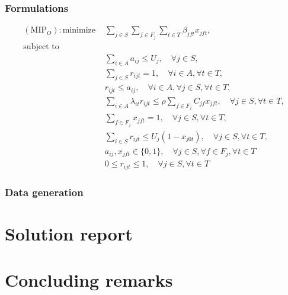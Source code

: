 \subsubsection{Formulations}
\begin{align}
(\textrm{MIP}_O): \textrm{minimize    } &\sum_{j\in S}\sum_{f\in F_j}\sum_{t\in T}\beta_{jft}x_{jft},\\
\textrm{subject to} \nonumber\\ 
&\sum_{i\in A}a_{ij} \le U_j, \quad \forall j\in S,\\
&\sum_{j\in S}r_{ijt}=1, \quad \forall i\in A, \forall t\in T,\\
&r_{ijt} \le a_{ij}, \quad \forall i\in A, \forall j\in S, \forall t\in T, \\
&\sum_{i\in A}\lambda_{it}r_{ijt} \le \rho \sum_{f\in F_j}C_{jf}x_{jft}, \quad \forall j\in S, \forall t\in T,\\
&\sum_{f\in F_j}x_{jft}=1, \quad \forall j\in S, \forall t\in T, \\
&\sum_{i\in S}r_{ijt} \le U_j(1-x_{j0t}), \quad \forall j\in S, \forall t\in T, \\
&a_{ij}, x_{jft}\in \{0,1\}, \quad \forall j\in S, \forall f\in F_j, \forall t\in T  \\
&0 \le r_{ijt} \le 1, \quad \forall j\in S, \forall t\in T
\end{align}

\subsubsection{Data generation}

\section{Solution report}

\section{Concluding remarks}


